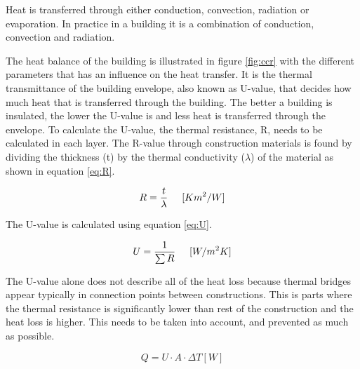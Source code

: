 Heat is transferred through either conduction, convection, radiation or evaporation. In practice in a building it is a combination of conduction, convection and radiation. 

The heat balance of the building is illustrated in figure \ref{fig:ccr} with the different parameters that has an influence on the heat transfer. It is the thermal transmittance of the building envelope, also known as U-value, that decides how much heat that is transferred through the building. The better a building is insulated, the lower the U-value is and less heat is transferred through the envelope. To calculate the U-value, the thermal resistance, R, needs to be calculated in each layer. The R-value through construction materials is found by dividing the thickness (t) by the thermal conductivity ($\lambda$) of the material as shown in equation \ref{eq:R}. 

\begin{equation}
    R = \frac{t}{\lambda} \hspace{5mm} [K m^2/W]
    \label{eq:R}
\end{equation}

The U-value is calculated using equation \ref{eq:U}.

\begin{equation}
    \label{eq:U}
    U = \frac{1}{\sum R} \hspace{5mm} [W/m^2 K]
\end{equation}

The U-value alone does not describe all of the heat loss because thermal bridges appear typically in connection points between constructions. This is parts where the thermal resistance is significantly lower than rest of the construction and the heat loss is higher. This needs to be taken into account, and prevented as much as possible. 

\begin{equation}
    Q = U \cdot A \cdot \Delta T [W]
\end{equation}

